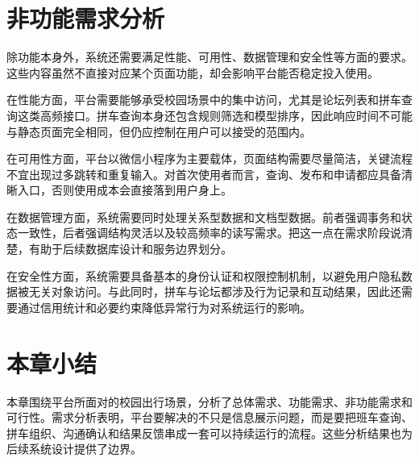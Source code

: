 \section{非功能需求分析}

除功能本身外，系统还需要满足性能、可用性、数据管理和安全性等方面的要求。这些内容虽然不直接对应某个页面功能，却会影响平台能否稳定投入使用。

在性能方面，平台需要能够承受校园场景中的集中访问，尤其是论坛列表和拼车查询这类高频接口。拼车查询本身还包含规则筛选和模型排序，因此响应时间不可能与静态页面完全相同，但仍应控制在用户可以接受的范围内。

在可用性方面，平台以微信小程序为主要载体，页面结构需要尽量简洁，关键流程不宜出现过多跳转和重复输入。对首次使用者而言，查询、发布和申请都应具备清晰入口，否则使用成本会直接落到用户身上。

在数据管理方面，系统需要同时处理关系型数据和文档型数据。前者强调事务和状态一致性，后者强调结构灵活以及较高频率的读写需求。把这一点在需求阶段说清楚，有助于后续数据库设计和服务边界划分。

在安全性方面，系统需要具备基本的身份认证和权限控制机制，以避免用户隐私数据被无关对象访问。与此同时，拼车与论坛都涉及行为记录和互动结果，因此还需要通过信用统计和必要约束降低异常行为对系统运行的影响。

\section{本章小结}

本章围绕平台所面对的校园出行场景，分析了总体需求、功能需求、非功能需求和可行性。需求分析表明，平台要解决的不只是信息展示问题，而是要把班车查询、拼车组织、沟通确认和结果反馈串成一套可以持续运行的流程。这些分析结果也为后续系统设计提供了边界。


